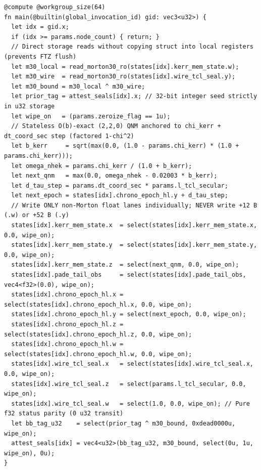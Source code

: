 \documentclass[11pt,a4paper,reqno]{article}
\theoremstyle{plain}
\theoremstyle{definition}
\theoremstyle{remark}
\numberwithin{equation}{section}
\numberwithin{table}{section}
\begin{document}
\begin{lstlisting}
@compute @workgroup_size(64)
fn main(@builtin(global_invocation_id) gid: vec3<u32>) {
  let idx = gid.x;
  if (idx >= params.node_count) { return; }
  // Direct storage reads without copying struct into local registers (prevents FTZ flush)
  let m30_local = read_morton30_ro(states[idx].kerr_mem_state.w);
  let m30_wire  = read_morton30_ro(states[idx].wire_tcl_seal.y);
  let m30_bound = m30_local ^ m30_wire;
  let prior_tag = attest_seals[idx].x; // 32-bit integer seed strictly in u32 storage
  let wipe_on   = (params.zeroize_flag == 1u);
  // Stateless O(b)-exact (2,2,0) QNM anchored to chi_kerr + dt_coord_sec step (factored 1-chi^2)
  let b_kerr     = sqrt(max(0.0, (1.0 - params.chi_kerr) * (1.0 + params.chi_kerr)));
  let omega_nhek = params.chi_kerr / (1.0 + b_kerr);
  let next_qnm   = max(0.0, omega_nhek - 0.02003 * b_kerr);
  let d_tau_step = params.dt_coord_sec * params.l_tcl_secular;
  let next_epoch = states[idx].chrono_epoch_hl.y + d_tau_step;
  // Write ONLY non-Morton float lanes individually; NEVER write +12 B (.w) or +52 B (.y)
  states[idx].kerr_mem_state.x  = select(states[idx].kerr_mem_state.x, 0.0, wipe_on);
  states[idx].kerr_mem_state.y  = select(states[idx].kerr_mem_state.y, 0.0, wipe_on);
  states[idx].kerr_mem_state.z  = select(next_qnm, 0.0, wipe_on);
  states[idx].pade_tail_obs     = select(states[idx].pade_tail_obs, vec4<f32>(0.0), wipe_on);
  states[idx].chrono_epoch_hl.x = select(states[idx].chrono_epoch_hl.x, 0.0, wipe_on);
  states[idx].chrono_epoch_hl.y = select(next_epoch, 0.0, wipe_on);
  states[idx].chrono_epoch_hl.z = select(states[idx].chrono_epoch_hl.z, 0.0, wipe_on);
  states[idx].chrono_epoch_hl.w = select(states[idx].chrono_epoch_hl.w, 0.0, wipe_on);
  states[idx].wire_tcl_seal.x   = select(states[idx].wire_tcl_seal.x, 0.0, wipe_on);
  states[idx].wire_tcl_seal.z   = select(params.l_tcl_secular, 0.0, wipe_on);
  states[idx].wire_tcl_seal.w   = select(1.0, 0.0, wipe_on); // Pure f32 status parity (0 u32 transit)
  let bb_tag_u32    = select(prior_tag ^ m30_bound, 0xdead0000u, wipe_on);
  attest_seals[idx] = vec4<u32>(bb_tag_u32, m30_bound, select(0u, 1u, wipe_on), 0u);
}
\end{lstlisting}
\end{document}
